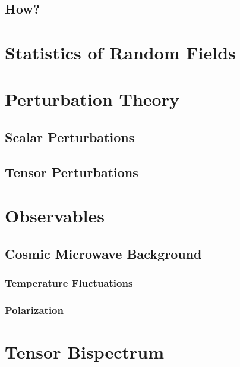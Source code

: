 \documentclass[12pt]{article}
\begin{document}
\subsection{How?}

\section{Statistics of Random Fields}


\section{Perturbation Theory}

\subsection{Scalar Perturbations}

\subsection{Tensor Perturbations}

\section{Observables}

\subsection{Cosmic Microwave Background}

\subsubsection{Temperature Fluctuations}
\subsubsection{Polarization}

\section{Tensor Bispectrum}
\end{document}
